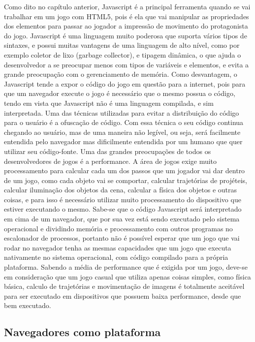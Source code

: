Como dito no capítulo anterior, Javascript é a principal ferramenta
quando se vai trabalhar em um jogo com HTML5, pois é ela que vai
manipular as propriedades dos elementos para passar ao jogador a
impressão de movimento do protagonista do jogo.
Javascript é uma linguagem muito poderosa que suporta vários tipos de
sintaxes, e possui muitas vantagens de uma linguagem de alto nível,
como por exemplo coletor de lixo (garbage collector), e tipagem
dinâmica, o que ajuda o desenvolvedor a se preocupar menos com tipos
de variáveis e elementos, e evita a grande preocupação com o
gerenciamento de memória.
Como desvantagem, o Javascript tende a expor o código do jogo em
questão para a internet, pois para que um navegador execute o jogo é
necessário que o mesmo possua o código, tendo em vista que Javascript
não é uma linguagem compilada, e sim interpretada. Uma das técnicas
utilizadas para evitar a distribuição do código para o usuário é a
ofuscação de código. Com essa técnica o seu código continua chegando
ao usuário, mas de uma maneira não legível, ou seja, será facilmente
entendida pelo navegador mas dificilmente entendida por um humano que
quer utilizar seu código-fonte.
Uma das grandes preocupações de todos os desenvolvedores de jogos é a
performance. A área de jogos exige muito processamento para calcular
cada um dos passos que um jogador vai dar dentro de um jogo, como cada
objeto vai se comportar, calcular trajetórias de projéteis, calcular
iluminação dos objetos da cena, calcular a física dos objetos e outras
coisas, e para isso é necessário utilizar muito processamento do
dispositivo que estiver executando o mesmo.
Sabe-se que o código Javascript será interpretado em cima de um navegador, que por sua vez está sendo
executado pelo sistema operacional e dividindo memória e processamento
com outros programas no escalonador de processos, portanto não
é possível esperar que um jogo que vai rodar no navegador tenha as mesmas
capacidades que um jogo que executa nativamente no sistema
operacional, com código compilado para a própria plataforma.
Sabendo a média de performance que é exigida por um jogo,
deve-se em consideração que um jogo casual que utiliza apenas
coisas simples, como física básica, calculo de trajetórias e
movimentação de imagens é totalmente aceitável para ser executado em
dispositivos que possuem baixa performance, desde que bem executado.

\subsection{Navegadores como plataforma}

